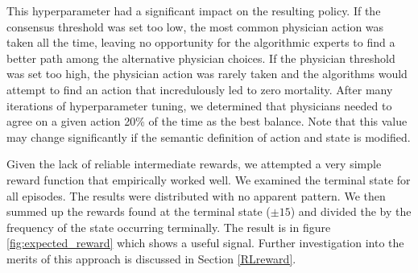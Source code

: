 \documentclass[letterpaper]{article}
\begin{document}
This hyperparameter had a significant impact on the resulting
policy. If the consensus threshold was set too low, the most common physician action was taken 
all the time, leaving no opportunity for the algorithmic experts to find a better path among
the alternative physician choices. If the physician threshold was set too high, the physician
action was rarely taken and the algorithms would attempt to find an action that incredulously
led to zero mortality. After many iterations of hyperparameter tuning, we determined that physicians
needed to agree on
a given action 20\% of the time as the best balance. Note that this value may change significantly
if the semantic definition of action and state is modified.

Given the lack of reliable intermediate rewards, we attempted a very simple reward function
that empirically worked well. We examined the terminal state for all episodes. The results were
distributed with no apparent pattern. We then summed up the rewards found at the terminal 
state ($\pm 15$) and divided the by the frequency of the state occurring terminally. 
The result is in figure \ref{fig:expected_reward} which shows a useful signal. Further 
investigation into the merits of this approach is discussed in Section \ref{RLreward}.
\end{document}
